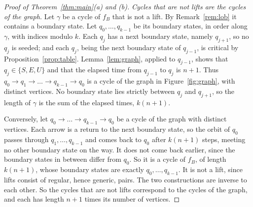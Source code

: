 \documentclass[11pt]{amsart}
\theoremstyle{definition}
\theoremstyle{remark}
\begin{document}
\begin{proof}[Proof of Theorem~\ref{thm:main}\textup{(a)} and \textup{(b)}]
\emph{Cycles that are not lifts are the cycles of the graph.} Let $\gamma$ be a cycle of $f_B$ that is not a lift. By Remark~\ref{rem:lob} it contains a boundary state. Let $q_0,\dots,q_{k-1}$ be its boundary states, in order along $\gamma$, with indices modulo $k$. Each $q_j$ has a next boundary state, namely $q_{j+1}$, so no $q_j$ is seeded; and each $q_j$, being the next boundary state of $q_{j-1}$, is critical by Proposition~\ref{prop:table}. Lemma~\ref{lem:graph}, applied to $q_{j-1}$, shows that $q_j\in\{S,E,U\}$ and that the elapsed time from $q_{j-1}$ to $q_j$ is $n+1$. Thus $q_0\to q_1\to\dots\to q_{k-1}\to q_0$ is a cycle of the graph in Figure~\ref{fig:graph}, with distinct vertices. No boundary state lies strictly between $q_j$ and $q_{j+1}$, so the length of $\gamma$ is the sum of the elapsed times, $k(n+1)$.

Conversely, let $q_0\to\dots\to q_{k-1}\to q_0$ be a cycle of the graph with distinct vertices. Each arrow is a return to the next boundary state, so the orbit of $q_0$ passes through $q_1,\dots,q_{k-1}$ and comes back to $q_0$ after $k(n+1)$ steps, meeting no other boundary state on the way. It does not come back earlier, since the boundary states in between differ from $q_0$. So it is a cycle of $f_B$, of length $k(n+1)$, whose boundary states are exactly $q_0,\dots,q_{k-1}$. It is not a lift, since lifts consist of regular, hence generic, pairs. The two constructions are inverse to each other. So the cycles that are not lifts correspond to the cycles of the graph, and each has length $n+1$ times its number of vertices.


\end{proof}
\end{document}

